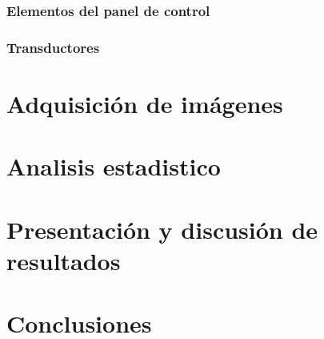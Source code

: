 \documentclass[letterpaper,12pt,oneside]{book}
\begin{document}
\subsection{Elementos del panel de control}
\subsection{Transductores}





\chapter{Adquisición de imágenes}
\chapter{Analisis estadistico}
\chapter{Presentación y discusión de resultados}
\chapter{Conclusiones}


 
    
\end{document}
